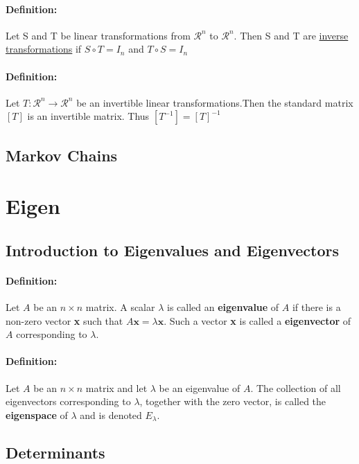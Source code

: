 \documentclass[12pt]{article}
\newenvironment{definition}{\paragraph{Definition: }}{\hfill}
\begin{document}
\begin{definition}
	Let S and T be linear transformations from $\mathcal{R}^n$ to $\mathcal{R}^n$. Then S and T are \underline{inverse transformations} if $S \circ T = I_n$ and $T \circ S = I_n$
\end{definition}


\begin{definition}
	Let $T: \mathcal{R}^n \rightarrow \mathcal{R}^n$ be an invertible linear transformations.Then the standard matrix $\left[ T \right]$ is an invertible matrix. Thus  $\left[ T^{-1} \right] =  \left[ T \right]^{-1}$
\end{definition}

\subsection{Markov Chains}

\newpage
\section{Eigen}
\subsection{Introduction to Eigenvalues and Eigenvectors}

\begin{definition}
	Let $A$ be an $n \times n$ matrix. A scalar $\lambda$ is called an \textbf{eigenvalue} of $A$ if there is a non-zero vector \textbf{x} such that $A\textbf{x} = \lambda \textbf{x}$. Such a vector \textbf{x} is called a \textbf{eigenvector} of $A$ corresponding to $\lambda$.
\end{definition}

\begin{definition}
	Let $A$ be an $n \times n$ matrix and let $\lambda$ be an eigenvalue of $A$. The collection of all eigenvectors corresponding to $\lambda$, together with the zero vector, is called the \textbf{eigenspace} of $\lambda$ and is denoted $E_\lambda$.
\end{definition}

\subsection{Determinants}
\end{document}
